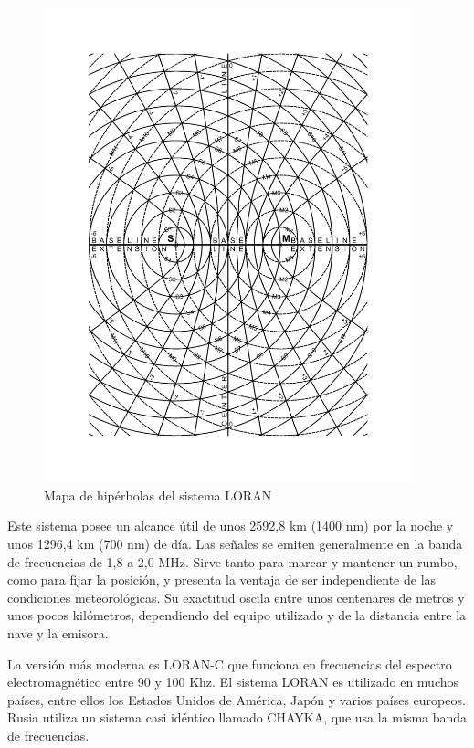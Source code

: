 \begin{figure}[!tbh]
  \centering
  \includegraphics[width=0.95\textwidth]{Imagenes/06.01.adf/hypnavig.pdf}
  \caption{Mapa de hip\'erbolas del sistema LORAN \cite{Loran_conicas}}
  \label{fig:LORAN_hiperbolas}
\end{figure}


Este sistema posee un alcance \'util de unos 2592,8 km (1400 nm) por la noche y unos 1296,4 km (700 nm) de d\'ia. Las se\~nales se emiten generalmente en la banda de frecuencias de 1,8 a 2,0 MHz. Sirve tanto para marcar y mantener un rumbo, como para fijar la posici\'on, y presenta la ventaja de ser independiente de las condiciones meteorol\'ogicas. Su exactitud oscila entre unos centenares de metros y unos pocos kil\'ometros, dependiendo del equipo utilizado y de la distancia entre la nave y la emisora. 


La versi\'on m\'as moderna es LORAN-C que funciona en frecuencias del espectro electromagn\'etico entre 90 y 100 Khz. El sistema LORAN es utilizado en muchos pa\'ises, entre ellos los Estados Unidos de Am\'erica, Jap\'on y varios pa\'ises europeos. Rusia utiliza un sistema casi id\'entico llamado CHAYKA, que usa la misma banda de frecuencias. 

